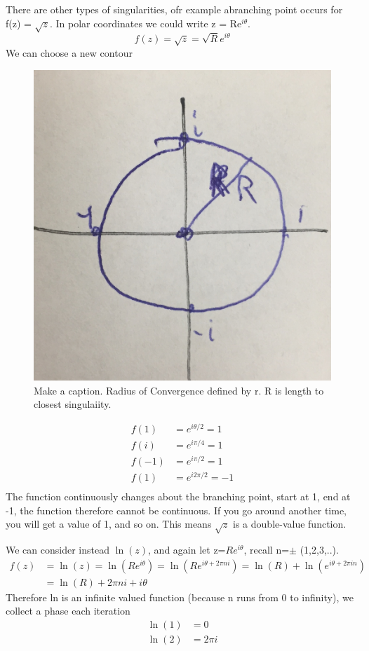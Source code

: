 \documentclass{article}
\newcommand{\be}{\begin{equation}}
\newcommand{\ee}{\end{equation}}
\begin{document}
There are other types of singularities, ofr example  abranching point occurs for f(z) = $\sqrt{z}$. 
In polar coordinates we could write z = Re$^{i\theta}$. 
\be
    f(z) = \sqrt{z} = \sqrt{R}e^{i\theta}
    \ee
We can choose a new contour
\begin{figure}[H]
  \centering
    \includegraphics[scale=0.2]{Figures/circle.png}
    \caption{Make a caption. Radius of Convergence defined by r. R is length to closest singulaiity.}
\end{figure}
\be
\begin{split}
    f(1) &= e^{i\theta/2} = 1\\
    f(i) &= e^{i\pi/4} = 1\\
    f(-1) &= e^{i\pi/2} = 1\\
    f(1) &= e^{i2\pi/2} = -1\\
\end{split}
\ee
The function continuously changes about the branching point, start at 1, end at -1, the function therefore cannot be continuous. 
If you go around another time, you will get a value of 1, and so on.
This means $\sqrt{z}$ is a double-value function.


We can consider instead $\ln(z)$, and again let z=$Re^{i\theta}$, recall n=$\pm$ (1,2,3,..). 
\be
\begin{split}
    f(z) &= \ln(z) = \ln(Re^{i\theta}) = \ln(Re^{i\theta+2\pi ni}) = \ln(R) + \ln(e^{i\theta + 2\pi in})\\
    &= \ln(R) + 2\pi ni + i\theta
\end{split} 
\ee
Therefore ln is an infinite valued function (because n runs from 0 to infinity), we collect a phase each iteration
\be
\begin{split}
    \ln(1) &= 0\\
    \ln(2) &= 2\pi i\\
\end{split}
\ee
\end{document}
